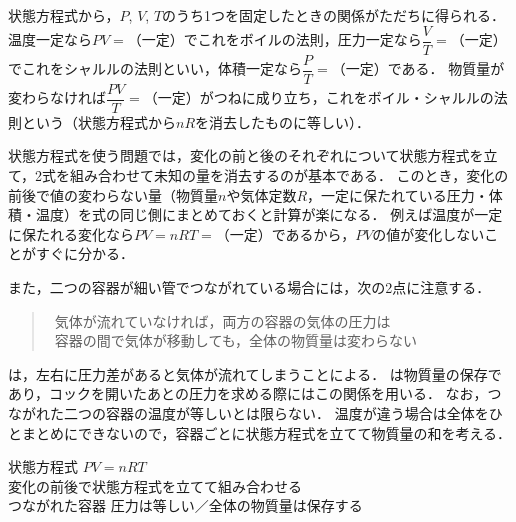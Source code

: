 状態方程式から，$P$, $V$, $T$のうち1つを固定したときの関係がただちに得られる．
温度一定なら$PV=$（一定）でこれを{\gtfamily ボイルの法則}，圧力一定なら$\dfrac{V}{T}=$（一定）でこれを{\gtfamily シャルルの法則}といい，体積一定なら$\dfrac{P}{T}=$（一定）である．
物質量が変わらなければ$\dfrac{PV}{T}=$（一定）がつねに成り立ち，これを{\gtfamily ボイル・シャルルの法則}という（状態方程式から$nR$を消去したものに等しい）．

状態方程式を使う問題では，{\gtfamily 変化の前と後のそれぞれについて状態方程式を立て，2式を組み合わせて未知の量を消去する}のが基本である．
このとき，変化の前後で値の変わらない量（物質量$n$や気体定数$R$，一定に保たれている圧力・体積・温度）を式の同じ側にまとめておくと計算が楽になる．
例えば温度が一定に保たれる変化なら$PV=nRT=$（一定）であるから，$PV$の値が変化しないことがすぐに分かる．

また，二つの容器が細い管でつながれている場合には，次の2点に注意する．
\begin{quote}
\noindent{}\ 気体が流れていなければ，両方の容器の気体の圧力は\\[1mm]
\ 容器の間で気体が移動しても，全体の物質量は変わらない
\end{quote}
\noindent{}は，左右に圧力差があると気体が流れてしまうことによる．
は物質量の保存であり，コックを開いたあとの圧力を求める際にはこの関係を用いる．
なお，つながれた二つの容器の{\gtfamily 温度が等しいとは限らない}．
温度が違う場合は全体をひとまとめにできないので，容器ごとに状態方程式を立てて物質量の和を考える．

\begin{matome}{状態方程式}
 \hspace{3mm} $PV=nRT$\\
\hspace{3mm} 変化の前後で状態方程式を立てて組み合わせる\\
\hspace{3mm} つながれた容器\hspace{5mm} 圧力は等しい／全体の物質量は保存する
\end{matome}

